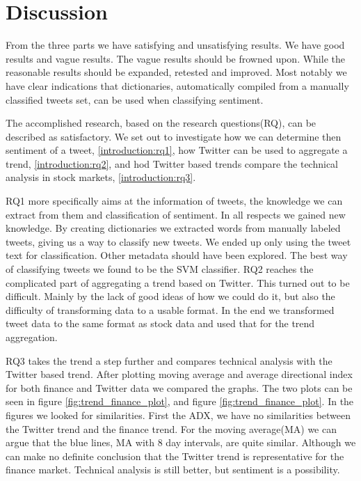 \section{Discussion}\label{results:discussion}
From the three parts we have satisfying and unsatisfying results. We have good
results and vague results. The vague results should be frowned upon. While the
reasonable results should be expanded, retested and improved. 
Most notably we have clear indications that dictionaries, automatically compiled
from a manually classified tweets set, can be used when classifying sentiment. 

The accomplished research, based on the research questions(RQ), can be described as
satisfactory. We set out to investigate how we can determine then sentiment of
a tweet, \ref{introduction:rq1}, how Twitter can be used to aggregate a trend,
\ref{introduction:rq2}, and hod Twitter based trends compare the technical
analysis in stock markets, \ref{introduction:rq3}. 

RQ1 more specifically aims at the information of tweets, the knowledge we
can extract from them and classification of sentiment. In all respects we
gained new knowledge. By creating dictionaries we extracted words from
manually labeled tweets, giving us a way to classify new tweets. We ended up
only using the tweet text for classification. Other metadata should have been
explored. The best way of classifying tweets we found to be the SVM classifier.    
RQ2 reaches the complicated part of aggregating a trend based on Twitter. This
turned out to be difficult. Mainly by the lack of good ideas of how we could do
it, but also the difficulty of transforming data to a usable format. In the end
we transformed tweet data to the same format as stock data and used that for
the trend aggregation. 

RQ3 takes the trend a step further and compares technical analysis with the
Twitter based trend. After plotting moving average and average directional
index for both finance and Twitter data we compared the graphs. The two plots
can be seen in figure \ref{fig:trend_finance_plot}, and figure
\ref{fig:trend_finance_plot}. In the figures we looked for similarities. 
First the ADX, we have no similarities between the Twitter trend and the
finance trend. For the moving average(MA) we can argue that the blue lines, MA
with 8 day intervals, are quite similar. Although we can make no definite
conclusion that the Twitter trend is representative for the finance market.
Technical analysis is still better, but sentiment is a possibility. 
%
